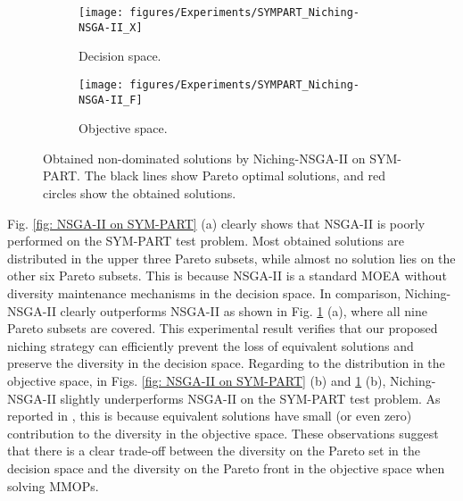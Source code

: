 \begin{figure}
	\centering
	\begin{subfigure}[b]{.49\textwidth}
		\texttt{[image: figures/Experiments/SYMPART\_Niching-NSGA-II\_X]}
		\caption{Decision space.}
	\end{subfigure}
	\begin{subfigure}[b]{.49\textwidth}
		\texttt{[image: figures/Experiments/SYMPART\_Niching-NSGA-II\_F]}
		\caption{Objective space.}
	\end{subfigure}
	\caption{Obtained non-dominated solutions by Niching-NSGA-II on SYM-PART. The black lines show Pareto optimal solutions, and red circles show the obtained solutions.}
	\label{fig: Niching-NSGA-II on SYM-PART}
\end{figure}

Fig. \ref{fig: NSGA-II on SYM-PART} (a) clearly shows that NSGA-II is poorly performed on the SYM-PART test problem. Most obtained solutions are distributed in the upper three Pareto subsets, while almost no solution lies on the other six Pareto subsets. This is because NSGA-II is a standard MOEA without diversity maintenance mechanisms in the decision space. In comparison, Niching-NSGA-II clearly outperforms NSGA-II as shown in Fig. \ref{fig: Niching-NSGA-II on SYM-PART} (a), where all nine Pareto subsets are covered. This experimental result verifies that our proposed niching strategy can efficiently prevent the loss of equivalent solutions and preserve the diversity in the decision space. Regarding to the distribution in the objective space, in Figs. \ref{fig: NSGA-II on SYM-PART} (b) and \ref{fig: Niching-NSGA-II on SYM-PART} (b), Niching-NSGA-II slightly underperforms NSGA-II on the SYM-PART test problem. As reported in \cite{tanabe2020review}, this is because equivalent solutions have small (or even zero) contribution to the diversity in the objective space. These observations suggest that there is a clear trade-off between the diversity on the Pareto set in the decision space and the diversity on the Pareto front in the objective space when solving MMOPs.

